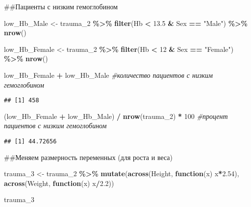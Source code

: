 \documentclass[
]{article}
\newenvironment{Shaded}{\begin{snugshade}}{\end{snugshade}}
\newcommand{\CommentTok}[1]{\textcolor[rgb]{0.56,0.35,0.01}{\textit{#1}}}
\newcommand{\ControlFlowTok}[1]{\textcolor[rgb]{0.13,0.29,0.53}{\textbf{#1}}}
\newcommand{\DecValTok}[1]{\textcolor[rgb]{0.00,0.00,0.81}{#1}}
\newcommand{\FloatTok}[1]{\textcolor[rgb]{0.00,0.00,0.81}{#1}}
\newcommand{\FunctionTok}[1]{\textcolor[rgb]{0.13,0.29,0.53}{\textbf{#1}}}
\newcommand{\NormalTok}[1]{#1}
\newcommand{\OtherTok}[1]{\textcolor[rgb]{0.56,0.35,0.01}{#1}}
\newcommand{\SpecialCharTok}[1]{\textcolor[rgb]{0.81,0.36,0.00}{\textbf{#1}}}
\newcommand{\StringTok}[1]{\textcolor[rgb]{0.31,0.60,0.02}{#1}}
\begin{document}
\#\#Пациенты с низким гемоглобином

\begin{Shaded}
\begin{Highlighting}[]
\NormalTok{low\_Hb\_Male }\OtherTok{\textless{}{-}}\NormalTok{ trauma\_2 }\SpecialCharTok{\%\textgreater{}\%}
  \FunctionTok{filter}\NormalTok{(Hb }\SpecialCharTok{\textless{}} \FloatTok{13.5} \SpecialCharTok{\&}\NormalTok{ Sex }\SpecialCharTok{==} \StringTok{"Male"}\NormalTok{) }\SpecialCharTok{\%\textgreater{}\%}
     \FunctionTok{nrow}\NormalTok{()}

\NormalTok{low\_Hb\_Female }\OtherTok{\textless{}{-}}\NormalTok{ trauma\_2 }\SpecialCharTok{\%\textgreater{}\%}
  \FunctionTok{filter}\NormalTok{(Hb }\SpecialCharTok{\textless{}} \DecValTok{12} \SpecialCharTok{\&}\NormalTok{ Sex }\SpecialCharTok{==} \StringTok{"Female"}\NormalTok{) }\SpecialCharTok{\%\textgreater{}\%}
     \FunctionTok{nrow}\NormalTok{()}

\NormalTok{low\_Hb\_Female }\SpecialCharTok{+}\NormalTok{ low\_Hb\_Male  }\CommentTok{\#количество пациентов с низким гемоглобином}
\end{Highlighting}
\end{Shaded}

\begin{verbatim}
## [1] 458
\end{verbatim}

\begin{Shaded}
\begin{Highlighting}[]
\NormalTok{(low\_Hb\_Female }\SpecialCharTok{+}\NormalTok{ low\_Hb\_Male) }\SpecialCharTok{/} \FunctionTok{nrow}\NormalTok{(trauma\_2) }\SpecialCharTok{*} \DecValTok{100} \CommentTok{\#процент пациентов с низким гемоглобином}
\end{Highlighting}
\end{Shaded}

\begin{verbatim}
## [1] 44.72656
\end{verbatim}

\#\#Меняем размерность переменных (для роста и веса)

\begin{Shaded}
\begin{Highlighting}[]
\NormalTok{trauma\_3 }\OtherTok{\textless{}{-}}\NormalTok{ trauma\_2 }\SpecialCharTok{\%\textgreater{}\%}
  \FunctionTok{mutate}\NormalTok{(}\FunctionTok{across}\NormalTok{(Height, }\ControlFlowTok{function}\NormalTok{(x) x}\SpecialCharTok{*}\FloatTok{2.54}\NormalTok{),}
         \FunctionTok{across}\NormalTok{(Weight, }\ControlFlowTok{function}\NormalTok{(x) x}\SpecialCharTok{/}\FloatTok{2.2}\NormalTok{))}

\NormalTok{trauma\_3}
\end{Highlighting}
\end{Shaded}
\end{document}
